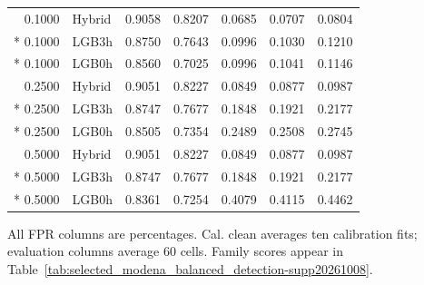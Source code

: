 \begin{longtable}{@{}rlrrrrr@{}}
0.1000 & Hybrid & 0.9058 & 0.8207 & 0.0685 & 0.0707 & 0.0804 \\*
0.1000 & LGB3h & 0.8750 & 0.7643 & 0.0996 & 0.1030 & 0.1210 \\*
0.1000 & LGB0h & 0.8560 & 0.7025 & 0.0996 & 0.1041 & 0.1146 \\
0.2500 & Hybrid & 0.9051 & 0.8227 & 0.0849 & 0.0877 & 0.0987 \\*
0.2500 & LGB3h & 0.8747 & 0.7677 & 0.1848 & 0.1921 & 0.2177 \\*
0.2500 & LGB0h & 0.8505 & 0.7354 & 0.2489 & 0.2508 & 0.2745 \\
0.5000 & Hybrid & 0.9051 & 0.8227 & 0.0849 & 0.0877 & 0.0987 \\*
0.5000 & LGB3h & 0.8747 & 0.7677 & 0.1848 & 0.1921 & 0.2177 \\*
0.5000 & LGB0h & 0.8361 & 0.7254 & 0.4079 & 0.4115 & 0.4462 \\
\end{longtable}
\noindent\footnotesize All FPR columns are percentages. Cal. clean averages ten calibration fits; evaluation columns average 60 cells. Family scores appear in Table~\ref{tab:selected_modena_balanced_detection-supp20261008}.
\par\endgroup
